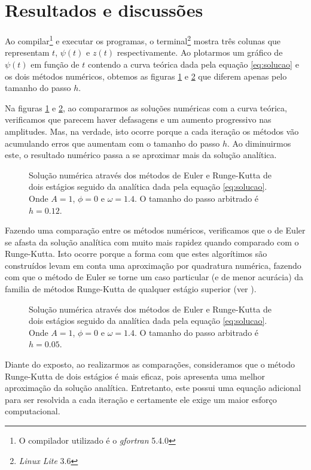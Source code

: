 \documentclass[
		12pt,            %
		a4paper
	      ]  
	      {article}          %
\begin{document}
	\section{Resultados e discussões}
	
	Ao compilar\footnote{O compilador utilizado é o {\it gfortran} 5.4.0} e executar os programas, o 
	terminal\footnote{{\it Linux Lite} 3.6} mostra três colunas que representam $t$, $\psi(t)$ e $z(t)$ 
	respectivamente. Ao plotarmos um gráfico de $\psi(t)$ em função de $t$ contendo a curva teórica dada 
	pela equação \ref{eq:solucao} e os dois métodos numéricos, obtemos as figuras \ref{fig:A} e \ref{fig:B} que 
	diferem apenas pelo tamanho do passo $h$.

	Na figuras \ref{fig:A} e \ref{fig:B}, ao compararmos as soluções numéricas com a curva teórica, verificamos 
	que parecem haver defasagens e um aumento progressivo nas amplitudes. Mas, na verdade, isto ocorre porque a 
	cada iteração os métodos vão acumulando erros que aumentam com o tamanho do passo $h$. Ao diminuirmos este,
	o resultado numérico passa a se aproximar mais da solução analítica. 

	\begin{figure}[h!]
		\centering
		\captionsetup{width=0.75\textwidth}
		\resizebox{0.65\textwidth}{!}{}
		\caption{Solução numérica através dos métodos de Euler e Runge-Kutta de dois estágios seguido da
			 analítica dada pela equação \ref{eq:solucao}. Onde $A = 1$, $\phi = 0$ e $\omega = 1.4$.
			 O tamanho do passo arbitrado é $h = 0.12$.}
		\label{fig:A}
	\end{figure}

	Fazendo uma comparação entre os métodos numéricos, verificamos que o de Euler se afasta da solução analítica 
	com muito mais rapidez quando comparado com o Runge-Kutta. Isto ocorre porque a forma com que estes 
	algorítimos são construídos levam em conta uma aproximação por quadratura numérica, fazendo com que o método 
	de Euler se torne um caso particular (e de menor acurácia) da familia de métodos Runge-Kutta de qualquer 
	estágio superior (ver \cite{NASA1967, Chapman2010C6, Chapman2010C7}).
	
	\begin{figure}[h!]\label{fig:hPequeno}
		\centering
		\captionsetup{width=0.75\textwidth}
		\resizebox{0.65\textwidth}{!}{}
		\caption{Solução numérica através dos métodos de Euler e Runge-Kutta de dois estágios seguido da
			 analítica dada pela equação \ref{eq:solucao}. Onde $A = 1$, $\phi = 0$ e $\omega = 1.4$.
			 O tamanho do passo arbitrado é $h = 0.05$.}
		\label{fig:B}
	\end{figure}
	Diante do exposto, ao realizarmos as comparações, consideramos que o método Runge-Kutta de dois estágios é 
	mais eficaz, pois apresenta uma melhor aproximação da solução analítica. Entretanto, este possui uma equação 
	adicional para ser resolvida a cada iteração e certamente ele exige um maior esforço computacional.
	
\end{document}
